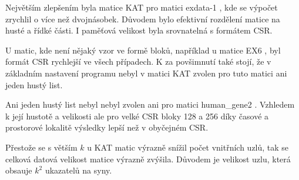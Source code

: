 Největším zlepšením byla matice KAT pro matici exdata-1 \cite{mtxexdata}, kde se výpočet zrychlil o více než dvojnásobek. Důvodem bylo efektivní rozdělení matice na husté a řídké části. I paměťová velikost byla srovnatelná s formátem CSR.

U matic, kde není nějaký vzor ve formě bloků, například u matice EX6 \cite{mtxex}, byl formát CSR rychlejší ve všech případech. K za povšimnutí také stojí, že v základním nastavení programu nebyl v matici KAT zvolen pro tuto matici ani jeden hustý list.

Ani jeden hustý list nebyl nebyl zvolen ani pro matici human\_gene2 \cite{mtxhuman}. Vzhledem k její hustotě a velikosti ale pro velké CSR bloky 128 a 256 díky časové a prostorové lokalitě \cite{cachelocal} výsledky lepší než v obyčejném CSR.

Přestože se s větším $k$ u KAT matic výrazně snížil počet vnitřních uzlů, tak se celková datová velikost matice výrazně zvýšila. Důvodem je velikost uzlu, která obsauje $k^2$ ukazatelů na syny. 
